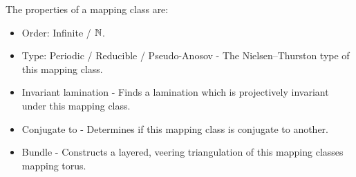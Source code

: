 \documentclass[a4paper]{article}
\begin{document}
The properties of a mapping class are:
\begin{itemize}
\item Order: Infinite / $\mathbb{N}$.
\item Type: Periodic / Reducible / Pseudo-Anosov - The Nielsen--Thurston type of this mapping class.
\item Invariant lamination - Finds a lamination which is projectively invariant under this mapping class.
\item Conjugate to - Determines if this mapping class is conjugate to another.
\item Bundle - Constructs a layered, veering triangulation of this mapping classes mapping torus.
\end{itemize}






\end{document}
